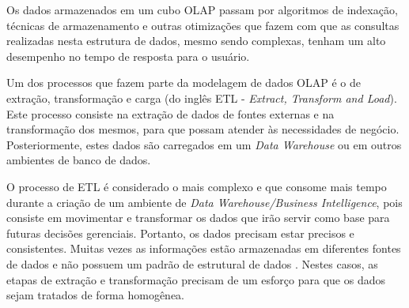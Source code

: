 Os dados armazenados em um cubo OLAP passam por algoritmos de indexação, técnicas de armazenamento e outras otimizações que fazem com que as consultas realizadas nesta estrutura de dados, mesmo sendo complexas, tenham um alto desempenho no tempo de resposta para o usuário.

Um dos processos que fazem parte da modelagem de dados OLAP é o de extração, transformação e carga (do inglês ETL - \emph{Extract, Transform and Load}). Este processo consiste na extração de dados de fontes externas e na transformação dos mesmos, para que possam atender às necessidades de negócio. Posteriormente, estes dados são carregados em um \emph{Data Warehouse} ou em outros ambientes de banco de dados.

O processo de ETL é considerado o mais complexo e que consome mais tempo durante a criação de um ambiente de \emph{Data Warehouse/Business Intelligence}, pois consiste em movimentar e transformar os dados que irão servir como base para futuras decisões gerenciais. Portanto, os dados precisam estar precisos e consistentes. 
Muitas vezes as informações estão armazenadas em diferentes fontes de dados e não possuem um padrão de estrutural de dados \cite{KIM13}. Nestes casos, as etapas de extração e transformação precisam de um esforço para que os dados sejam tratados de forma homogênea.























